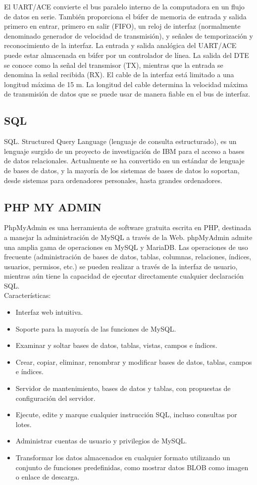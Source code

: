 \documentclass[12pt]{book}
\begin{document}
El UART/ACE convierte el bus paralelo interno de la computadora en un flujo de datos en serie. También proporciona el búfer de memoria de entrada y salida primero en entrar, primero en salir (FIFO), un reloj de interfaz (normalmente denominado generador de velocidad de transmisión), y señales de temporización y reconocimiento de la interfaz. La entrada y salida analógica del UART/ACE puede estar almacenada en búfer por un controlador de línea. La salida del DTE se conoce como la señal del transmisor (TX), mientras que la entrada se denomina la señal recibida (RX). El cable de la interfaz está limitado a una longitud máxima de 15 m. La longitud del cable determina la velocidad máxima de transmisión de datos que se puede usar de manera fiable en el bus de interfaz.


\subsection{SQL}
SQL. Structured Query Language (lenguaje de consulta estructurado), es un lenguaje surgido de un proyecto de investigación de IBM para el acceso a bases de datos relacionales. Actualmente se ha convertido en un estándar de lenguaje de bases de datos, y la mayoría de los sistemas de bases de datos lo soportan, desde sistemas para ordenadores personales, hasta grandes ordenadores. \\

\subsection{PHP MY ADMIN}
PhpMyAdmin es una herramienta de software gratuita escrita en PHP, destinada a manejar la administración de MySQL a través de la Web. phpMyAdmin admite una amplia gama de operaciones en MySQL y MariaDB. Las operaciones de uso frecuente (administración de bases de datos, tablas, columnas, relaciones, índices, usuarios, permisos, etc.) se pueden realizar a través de la interfaz de usuario, mientras aún tiene la capacidad de ejecutar directamente cualquier declaración SQL. \\
Características:

\begin{itemize}
 	\item Interfaz web intuitiva.
 	\item Soporte para la mayoría de las funciones de MySQL.
 	\item Examinar y soltar bases de datos, tablas, vistas, campos e índices.
 	\item Crear, copiar, eliminar, renombrar y modificar bases de datos, tablas, campos e índices.
	\item Servidor de mantenimiento, bases de datos y tablas, con propuestas de configuración del servidor.
	\item Ejecute, edite y marque cualquier instrucción SQL, incluso consultas por lotes.
	\item Administrar cuentas de usuario y privilegios de MySQL.
	\item Transformar los datos almacenados en cualquier formato utilizando un conjunto de funciones predefinidas, como mostrar datos BLOB como imagen o enlace de descarga.
 \end{itemize}
\end{document}
